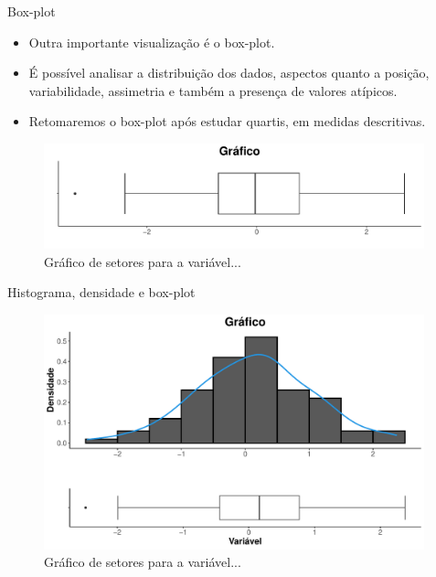 \documentclass[
  ignorenonframetext,
  serif,
  professionalfont,
  usenames,
  dvipsnames,
  aspectratio = 169]{beamer}
\begin{document}
\begin{frame}{Box-plot}
\protect\hypertarget{box-plot}{}
\begin{itemize}
\item
  Outra importante visualização é o box-plot.
\item
  É possível analisar a distribuição dos dados, aspectos quanto a
  posição, variabilidade, assimetria e também a presença de valores
  atípicos.
\item
  Retomaremos o box-plot após estudar quartis, em medidas descritivas.
\end{itemize}

\begin{figure}

{\centering \includegraphics[width=11cm]{200-exploratoria-uni-tabelas-graficos_files/figure-beamer/unnamed-chunk-24-1} 

}

\caption{Gráfico de setores para a variável...}\label{fig:unnamed-chunk-24}
\end{figure}
\end{frame}

\begin{frame}{Histograma, densidade e box-plot}
\protect\hypertarget{histograma-densidade-e-box-plot}{}
\begin{figure}

{\centering \includegraphics[width=11cm]{200-exploratoria-uni-tabelas-graficos_files/figure-beamer/unnamed-chunk-25-1} 

}

\caption{Gráfico de setores para a variável...}\label{fig:unnamed-chunk-25}
\end{figure}
\end{frame}
\end{document}
